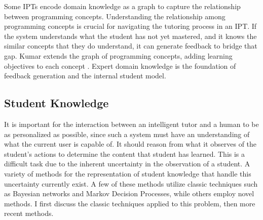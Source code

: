 Some IPTs encode domain knowledge as a graph to capture the relationship between programming concepts. Understanding the relationship among programming concepts is crucial for navigating the tutoring process in an IPT. If the system understands what the student has not yet mastered, and it knows the similar concepts that they do understand, it can generate feedback to bridge that gap. Kumar extends the graph of programming concepts, adding learning objectives to each concept \cite{Kumar2014}. Expert domain knowledge is the foundation of feedback generation and the internal student model.

\subsection{Student Knowledge}

It is important for the interaction between an intelligent tutor and a human to be as personalized as possible, since such a system must have an understanding of what the current user is capable of. It should reason from what it observes of the student's actions to determine the content that student has learned. This is a difficult task due to the inherent uncertainty in the observation of a student. A variety of methods for the representation of student knowledge that handle this uncertainty currently exist. A few of these methods utilize classic techniques such as Bayesian networks and Markov Decision Processes, while others employ novel methods. I first discuss the classic techniques applied to this problem, then more recent methods.


